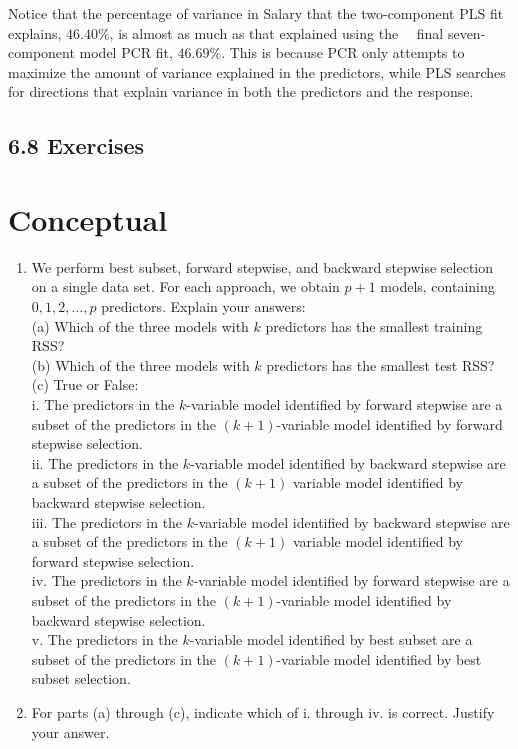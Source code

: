 \documentclass[10pt]{article}
\begin{document}
Notice that the percentage of variance in Salary that the two-component PLS fit explains, $46.40 \%$, is almost as much as that explained using the\
\
final seven-component model PCR fit, $46.69 \%$. This is because PCR only attempts to maximize the amount of variance explained in the predictors, while PLS searches for directions that explain variance in both the predictors and the response.

\subsection*{6.8 Exercises}
\section*{Conceptual}
\begin{enumerate}
  \item We perform best subset, forward stepwise, and backward stepwise selection on a single data set. For each approach, we obtain $p+1$ models, containing $0,1,2, \ldots, p$ predictors. Explain your answers:\\
(a) Which of the three models with $k$ predictors has the smallest training RSS?\\
(b) Which of the three models with $k$ predictors has the smallest test RSS?\\
(c) True or False:\\
i. The predictors in the $k$-variable model identified by forward stepwise are a subset of the predictors in the $(k+1)$-variable model identified by forward stepwise selection.\\
ii. The predictors in the $k$-variable model identified by backward stepwise are a subset of the predictors in the $(k+1)$ variable model identified by backward stepwise selection.\\
iii. The predictors in the $k$-variable model identified by backward stepwise are a subset of the predictors in the $(k+1)$ variable model identified by forward stepwise selection.\\
iv. The predictors in the $k$-variable model identified by forward stepwise are a subset of the predictors in the $(k+1)$-variable model identified by backward stepwise selection.\\
v. The predictors in the $k$-variable model identified by best subset are a subset of the predictors in the $(k+1)$-variable model identified by best subset selection.
  \item For parts (a) through (c), indicate which of i. through iv. is correct. Justify your answer.\

\end{enumerate}
\end{document}
